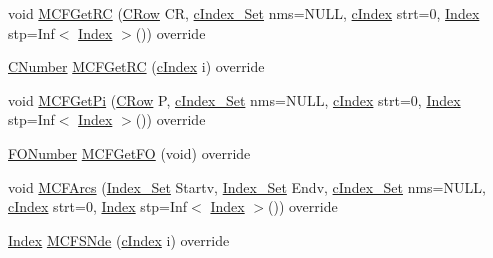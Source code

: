 \begin{DoxyCompactItemize}
\item 
void \mbox{\hyperlink{class_m_c_f_cplex_a9cc0f8dbc79bf2fd7744a6ad32b3e985}{M\+C\+F\+Get\+RC}} (\mbox{\hyperlink{class_m_c_f_class_a62409402be4e4b301e1a568f99f877be}{C\+Row}} CR, \mbox{\hyperlink{class_m_c_f_class_a81575b2d4e4d5636b17170432150ae69}{c\+Index\+\_\+\+Set}} nms=N\+U\+LL, \mbox{\hyperlink{class_m_c_f_class_a76aaabb20535c51a2752b93f6c38fe54}{c\+Index}} strt=0, \mbox{\hyperlink{class_m_c_f_class_ad53d6229d7ec28555a9c9c2fd9abf773}{Index}} stp=Inf$<$ \mbox{\hyperlink{class_m_c_f_class_ad53d6229d7ec28555a9c9c2fd9abf773}{Index}} $>$()) override
\item 
\mbox{\hyperlink{class_m_c_f_class_a24d0627ba8213afe1ec4ebeb4508e8f1}{C\+Number}} \mbox{\hyperlink{class_m_c_f_cplex_af760d0f98c95f89378b36d14b4e98551}{M\+C\+F\+Get\+RC}} (\mbox{\hyperlink{class_m_c_f_class_a76aaabb20535c51a2752b93f6c38fe54}{c\+Index}} i) override
\item 
void \mbox{\hyperlink{class_m_c_f_cplex_abb97afaf7df33019f1b728138a254d6d}{M\+C\+F\+Get\+Pi}} (\mbox{\hyperlink{class_m_c_f_class_a62409402be4e4b301e1a568f99f877be}{C\+Row}} P, \mbox{\hyperlink{class_m_c_f_class_a81575b2d4e4d5636b17170432150ae69}{c\+Index\+\_\+\+Set}} nms=N\+U\+LL, \mbox{\hyperlink{class_m_c_f_class_a76aaabb20535c51a2752b93f6c38fe54}{c\+Index}} strt=0, \mbox{\hyperlink{class_m_c_f_class_ad53d6229d7ec28555a9c9c2fd9abf773}{Index}} stp=Inf$<$ \mbox{\hyperlink{class_m_c_f_class_ad53d6229d7ec28555a9c9c2fd9abf773}{Index}} $>$()) override
\item 
\mbox{\hyperlink{class_m_c_f_class_af5ee7b3099b0bc780a6a4b43629488fa}{F\+O\+Number}} \mbox{\hyperlink{class_m_c_f_cplex_a854a2b3ad7bb3cca0326c8f581a2d673}{M\+C\+F\+Get\+FO}} (void) override
\item 
void \mbox{\hyperlink{class_m_c_f_cplex_ae06f34c21f0b08a677f6af83f7c41fd0}{M\+C\+F\+Arcs}} (\mbox{\hyperlink{class_m_c_f_class_ace3388eb329ff0551a0b86b6c67e33d8}{Index\+\_\+\+Set}} Startv, \mbox{\hyperlink{class_m_c_f_class_ace3388eb329ff0551a0b86b6c67e33d8}{Index\+\_\+\+Set}} Endv, \mbox{\hyperlink{class_m_c_f_class_a81575b2d4e4d5636b17170432150ae69}{c\+Index\+\_\+\+Set}} nms=N\+U\+LL, \mbox{\hyperlink{class_m_c_f_class_a76aaabb20535c51a2752b93f6c38fe54}{c\+Index}} strt=0, \mbox{\hyperlink{class_m_c_f_class_ad53d6229d7ec28555a9c9c2fd9abf773}{Index}} stp=Inf$<$ \mbox{\hyperlink{class_m_c_f_class_ad53d6229d7ec28555a9c9c2fd9abf773}{Index}} $>$()) override
\item 
\mbox{\hyperlink{class_m_c_f_class_ad53d6229d7ec28555a9c9c2fd9abf773}{Index}} \mbox{\hyperlink{class_m_c_f_cplex_aed95a5978f1e167d3dae5fc93d32e3aa}{M\+C\+F\+S\+Nde}} (\mbox{\hyperlink{class_m_c_f_class_a76aaabb20535c51a2752b93f6c38fe54}{c\+Index}} i) override

\end{DoxyCompactItemize}
